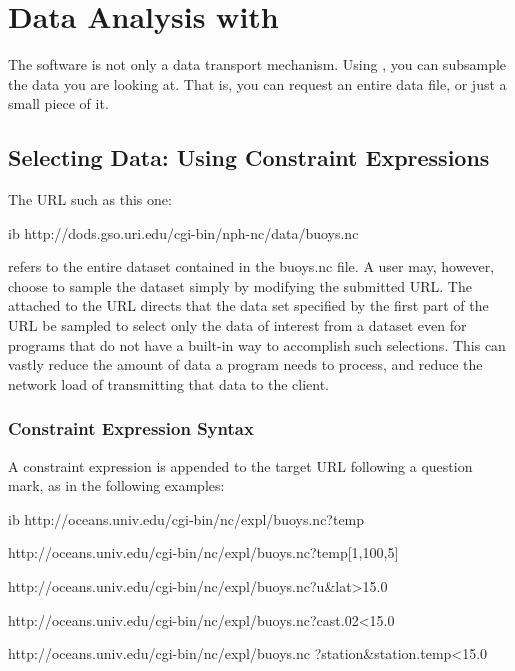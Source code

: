 %
%

\chapter{Data Analysis with \opendap}

The \opendap software is not only a data transport mechanism.  Using \opendap,
you can subsample the data you are looking at.  That is, you can
request an entire data file, or just a small piece of it.

\section{Selecting Data: Using Constraint Expressions}
\label{opd-client,constraint}

The URL such as this one:

\begin{vcode}{ib}
http://dods.gso.uri.edu/cgi-bin/nph-nc/data/buoys.nc
\end{vcode}

refers to the entire
dataset contained in the buoys.nc file. A user may, however, choose
to sample the dataset simply by modifying the submitted URL. The
 attached to the URL directs that the data
set specified by the first part of the URL be sampled to select only
the data of interest from a dataset even for programs that do not
have a built-in way to accomplish such selections.  This can vastly
reduce the amount of data a program needs to process, and reduce the
network load of transmitting that data to the client.

\subsection{Constraint Expression Syntax}
\label{opd-client,constraint-syntax}

A constraint expression is appended to the target URL following a
question mark, as in the following examples:

\begin{vcode}{ib}
 http://oceans.univ.edu/cgi-bin/nc/expl/buoys.nc?temp

 http://oceans.univ.edu/cgi-bin/nc/expl/buoys.nc?temp[1,100,5]

 http://oceans.univ.edu/cgi-bin/nc/expl/buoys.nc?u&lat>15.0

 http://oceans.univ.edu/cgi-bin/nc/expl/buoys.nc?cast.02<15.0
 
 http://oceans.univ.edu/cgi-bin/nc/expl/buoys.nc
                                   ?station&station.temp<15.0
\end{vcode}


